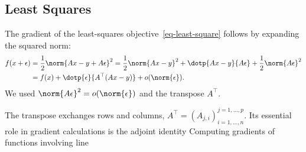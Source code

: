                                                                                   
\subsection{Least Squares}

The gradient of the least-squares objective~\eqref{eq-least-square} follows by expanding the squared norm:
\begin{align*}
	f(x+\epsilon) &= \frac{1}{2}\norm{Ax-y+A\epsilon}^2 = \frac12\norm{Ax-y}^2+\dotp{Ax-y}{A\epsilon} + \frac{1}{2}\norm{A\epsilon}^2 \\
		&=f(x) + \dotp{\epsilon}{A^\top(Ax-y)} + o(\norm{\epsilon}).
\end{align*} 
We used $\norm{A\epsilon}^2 = o(\norm{\epsilon})$ and the transpose $A^\top$.
 
The transpose exchanges rows and columns, $A^\top = (A_{j,i})_{i=1,\ldots,n}^{j=1,\ldots,p}$. Its essential role in gradient calculations is the adjoint identity
Computing gradients of functions involving line